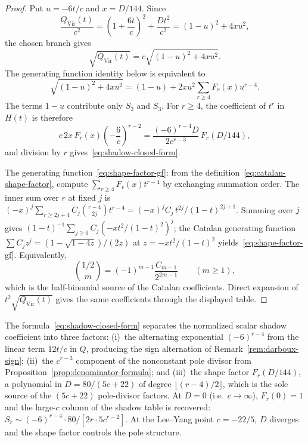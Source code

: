 \begin{proof}
Put \(u=-6t/c\) and \(x=D/144\).  Since
\[
 \frac{Q_{\mathrm{Vir}}(t)}{c^2}
 =\left(1+\frac{6t}{c}\right)^2+\frac{D t^2}{c^2}
 =(1-u)^2+4xu^2,
\]
the chosen branch gives
\[
\sqrt{Q_{\mathrm{Vir}}(t)}
=c\sqrt{(1-u)^2+4xu^2}.
\]
The generating function identity below is equivalent to
\[
\sqrt{(1-u)^2+4xu^2}
=(1-u)+2xu^2\sum_{r\ge4}F_r(x)u^{r-4}.
\]
The terms \(1-u\) contribute only \(S_2\) and \(S_3\).  For \(r\ge4\),
the coefficient of \(t^r\) in \(H(t)\) is therefore
\[
c\,2x\,F_r(x)\left(-\frac{6}{c}\right)^{r-2}
=\frac{(-6)^{r-4}D}{2c^{r-3}}\,F_r(D/144),
\]
and division by \(r\) gives~\eqref{eq:shadow-closed-form}.

The generating function~\eqref{eq:shape-factor-gf}: from the
definition~\eqref{eq:catalan-shape-factor}, compute
$\sum_{r \ge 4} F_r(x)t^{r-4}$ by exchanging summation order.
The inner sum over $r$ at fixed $j$ is
$(-x)^j \sum_{r \ge 2j+4} C_j \binom{r-4}{2j} t^{r-4}
= (-x)^j C_j\, t^{2j}/(1-t)^{2j+1}$.
Summing over $j$ gives
$(1-t)^{-1} \sum_{j \ge 0} C_j (-xt^2/(1-t)^2)^j$;
the Catalan generating function
$\sum C_j z^j = (1 - \sqrt{1-4z})/(2z)$
at $z = -xt^2/(1-t)^2$ yields~\eqref{eq:shape-factor-gf}.
Equivalently,
\[
\binom{1/2}{m}=(-1)^{m-1}\frac{C_{m-1}}{2^{2m-1}}
\qquad(m\ge1),
\]
which is the half-binomial source of the Catalan coefficients. Direct
expansion of \(t^2\sqrt{Q_{\mathrm{Vir}}(t)}\) gives the same
coefficients through the displayed table.
\end{proof}

\begin{remark}
\label{rem:shadow-closed-form-structure}%
The formula~\eqref{eq:shadow-closed-form} separates the normalized
scalar shadow coefficient into three factors: (i)~the alternating exponential
$(-6)^{r-4}$ from the linear term $12t/c$ in $Q$, producing the
sign alternation of Remark~\ref{rem:darboux-sign};
(ii)~the \(c^{r-3}\) component of the nonconstant pole divisor from
Proposition~\ref{prop:denominator-formula}; and (iii)~the shape
factor $F_r(D/144)$, a polynomial in $D = 80/(5c+22)$
of degree $\lfloor(r-4)/2\rfloor$, which is the sole
source of the $(5c+22)$ pole-divisor factors. At $D = 0$
(i.e.\ $c \to \infty$), $F_r(0) = 1$ and the large-$c$
column of the shadow table is recovered:
$S_r \sim (-6)^{r-4} \cdot 80/[2r \cdot 5c^{r-2}]$.
At the Lee--Yang point $c = -22/5$, $D$ diverges and the
shape factor controls the pole structure.
\end{remark}

